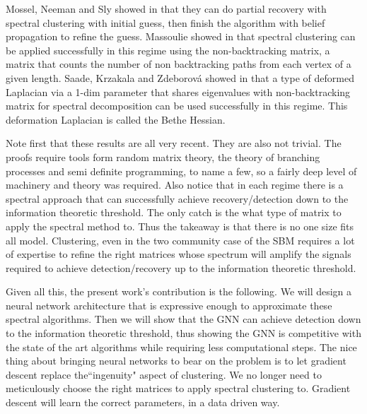 Mossel, Neeman and Sly showed in \cite{MNS_sparse} that they can do partial recovery with spectral clustering with initial guess, then finish the algorithm with belief propagation to refine the guess.  Massoulie showed in \cite{Massouli} that spectral clustering can be applied successfully in this regime using the non-backtracking matrix, a matrix that counts the number of non backtracking paths from each vertex of a given length.   Saade, Krzakala and Zdeborová showed in \cite{AFL} that a type of deformed Laplacian via a 1-dim parameter that shares eigenvalues with non-backtracking matrix for spectral decomposition can be used successfully in this regime.  This deformation Laplacian is called the Bethe Hessian.    

   
Note first that these results are all very recent. They are also not trivial.  The proofs require tools form random matrix theory, the theory of branching processes and semi definite programming, to name a few, so a fairly deep level of machinery and theory was required. Also notice that in each regime there is a spectral approach that can successfully achieve recovery/detection down to the information theoretic threshold.  The only catch is the what type of matrix to apply the spectral method to.  Thus the takeaway is that there is no one size fits all model. Clustering, even in the two community case of the SBM requires a lot of expertise to refine the right matrices whose spectrum will amplify the signals required to achieve detection/recovery up to the information theoretic threshold. 

Given all this, the present work's contribution is the following.  We will design a neural network architecture that is expressive enough to approximate these spectral algorithms.  Then we will show that the GNN can achieve detection down to the information theoretic threshold, thus showing the GNN is competitive with the state of the art algorithms while requiring less computational steps. %
The nice thing about bringing neural networks to bear on the problem is to let gradient descent replace the``ingenuity" aspect of clustering.  We no longer need to meticulously choose the right matrices to apply spectral clustering to.  Gradient descent will learn the correct parameters, in a data driven way. 
